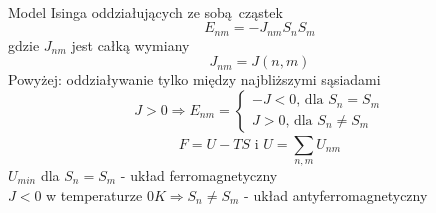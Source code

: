 \documentclass{article}
\begin{document}
		\paragraph{} Model Isinga oddziałujących ze sobą cząstek
		\begin{equation}
		E_{nm} = -J_{nm}S_nS_m
		\end{equation}
		gdzie $ J_{nm} $ jest całką wymiany 
		\begin{equation}
		J_{nm} = J(n,m)
		\end{equation}
		Powyżej: oddziaływanie tylko między najbliższymi sąsiadami
		\begin{equation}
			J > 0 \Rightarrow E_{nm} = 
			\begin{cases}
				-J < 0 \text{, dla } S_n = S_m \\
				J > 0 \text{, dla } S_n \neq S_m
			\end{cases}
		\end{equation}
		\begin{equation}
			F = U - TS \text{ i } U = \sum_{n,m}^{} U_{nm}
		\end{equation}
		$ U_{min} $ dla $ S_n = S_m $ - układ ferromagnetyczny \\
		$ J < 0  $ w temperaturze $ 0K \Rightarrow S_n \neq S_m$ - układ antyferromagnetyczny
\end{document}
